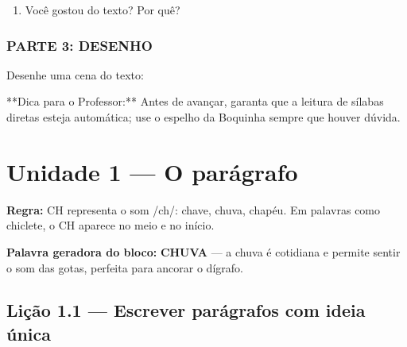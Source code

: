 \begin{exercicio}
\begin{enumerate}
  \item Você gostou do texto? Por quê?
  \begin{center}
  \underline{\hspace{12cm}}
  \end{center}

\end{enumerate}

\subsection*{PARTE 3: DESENHO}

Desenhe uma cena do texto:

\begin{center}
\end{center}

\end{exercicio}

\begin{dica}
**Dica para o Professor:** Antes de avançar, garanta que a leitura de sílabas diretas esteja automática; use o espelho da Boquinha sempre que houver dúvida.
\end{dica}


\chapter{Unidade 1 --- O parágrafo}


\textbf{Regra:} CH representa o som /ch/: chave, chuva, chapéu. Em palavras como chiclete, o CH aparece no meio e no início.

\textbf{Palavra geradora do bloco:} \textbf{CHUVA} --- a chuva é cotidiana e permite sentir o som das gotas, perfeita para ancorar o dígrafo.

\section{Lição 1.1 --- Escrever parágrafos com ideia única}

